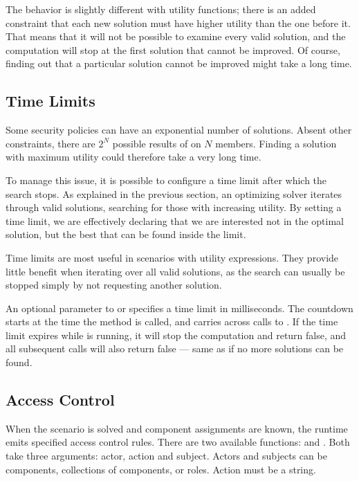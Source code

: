 The behavior is slightly different with utility functions; there is an added constraint
that each new solution must have higher utility than the one before it. That means that
it will not be possible to examine every valid solution, and the computation will stop
at the first solution that cannot be improved. Of course, finding out that a particular
solution cannot be improved might take a long time.


\subsection{Time Limits}
\label{dsl:c:time}

Some security policies can have an exponential number of solutions. Absent other
constraints, there are $2^N$ possible results of  on $N$ members. Finding a
solution with maximum utility could therefore take a very long time.

To manage this issue, it is possible to configure a time limit after which the search
stops. As explained in the previous section, an optimizing solver iterates through valid
solutions, searching for those with increasing utility. By setting a time limit, we are
effectively declaring that we are interested not in the optimal solution, but the best
that can be found inside the limit.

Time limits are most useful in scenarios with utility expressions. They provide little
benefit when iterating over all valid solutions, as the search can usually be stopped
simply by not requesting another solution.

An optional parameter to  or  specifies a time limit in
milliseconds. The countdown starts at the time the method is called, and carries across
calls to . If the time limit expires while  is running, it will
stop the computation and return false, and all subsequent calls will also return false
--- same as if no more solutions can be found.


\subsection{Access Control}
\label{dsl:c:access}

When the scenario is solved and component assignments are known, the runtime emits
specified access control rules. There are two available functions:  and
. Both take three arguments: actor, action and subject. Actors and subjects can
be components, collections of components, or roles. Action must be a string.

